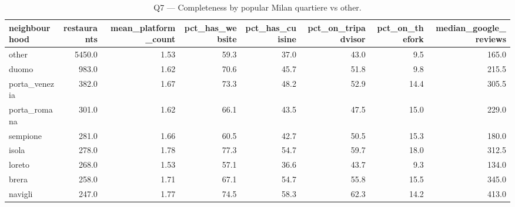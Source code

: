 \begin{table}[ht]
\centering
\caption{Q7 — Completeness by popular Milan quartiere vs other.}
\label{tab:q7_completeness_neighbourhood}
{\tiny
\begin{tabular}{lrrrrrrr}
\toprule
neighbourhood & restaurants & mean\_platform\_count & pct\_has\_website & pct\_has\_cuisine & pct\_on\_tripadvisor & pct\_on\_thefork & median\_google\_reviews \\
\midrule
other & 5450.0 & 1.53 & 59.3 & 37.0 & 43.0 & 9.5 & 165.0 \\
duomo & 983.0 & 1.62 & 70.6 & 45.7 & 51.8 & 9.8 & 215.5 \\
porta\_venezia & 382.0 & 1.67 & 73.3 & 48.2 & 52.9 & 14.4 & 305.5 \\
porta\_romana & 301.0 & 1.62 & 66.1 & 43.5 & 47.5 & 15.0 & 229.0 \\
sempione & 281.0 & 1.66 & 60.5 & 42.7 & 50.5 & 15.3 & 180.0 \\
isola & 278.0 & 1.78 & 77.3 & 54.7 & 59.7 & 18.0 & 312.5 \\
loreto & 268.0 & 1.53 & 57.1 & 36.6 & 43.7 & 9.3 & 134.0 \\
brera & 258.0 & 1.71 & 67.1 & 54.7 & 55.8 & 15.5 & 345.0 \\
navigli & 247.0 & 1.77 & 74.5 & 58.3 & 62.3 & 14.2 & 413.0 \\
\bottomrule
\end{tabular}
}
\end{table}
